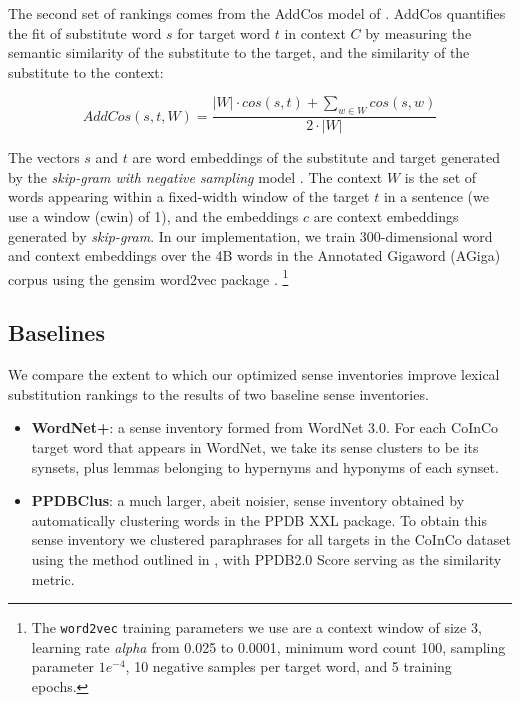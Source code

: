 \documentclass[11pt]{article}
\begin{document}
The second set of rankings comes from the AddCos model of . AddCos quantifies the fit of substitute word $s$ for target word $t$ in context $C$ by measuring the semantic similarity of the substitute to the target, and the similarity of the substitute to the context:

\begin{dmath}
	AddCos(s,t,W) = \frac{|W| \cdot cos(s,t) + \sum_{w \in W} cos(s,w)}{2 \cdot |W|}
\end{dmath}
	
\noindent The vectors $s$ and $t$ are word embeddings of the substitute and target generated by the \textit{skip-gram with negative sampling} model \cite{mikolov2013distributed,mikolov2013efficient}. The context $W$ is the set of words appearing within a fixed-width window of the target $t$ in a sentence (we use a window (cwin) of 1), and the embeddings $c$ are context embeddings generated by \textit{skip-gram}. In our implementation, we train 300-dimensional word and context embeddings over the 4B words in the Annotated Gigaword (AGiga) corpus \cite{napoles2012annotated} using the gensim word2vec package \cite{mikolov2013distributed,mikolov2013efficient,ismu:884893}. \footnote{The \texttt{word2vec} training parameters we use are a context window of size 3, learning rate \textit{alpha} from 0.025 to 0.0001, minimum word count 100, sampling parameter $1e^{-4}$, 10 negative samples per target word, and 5 training epochs.}

\subsection{Baselines}


We compare the extent to which our optimized sense inventories improve lexical substitution rankings to the results of two baseline sense inventories.

\begin{itemize}
\item\textbf{WordNet+}: a sense inventory formed from WordNet 3.0. For each CoInCo target word that appears in WordNet, we take its sense clusters to be its synsets, plus lemmas belonging to hypernyms and hyponyms of each synset. 
\item\textbf{PPDBClus}: a much larger, abeit noisier, sense inventory obtained by automatically clustering words in the PPDB XXL package. To obtain this sense inventory we clustered paraphrases for all targets in the CoInCo dataset using the method outlined in , with PPDB2.0 Score serving as the similarity metric.
\end{itemize}
\end{document}
